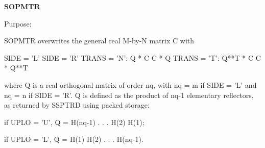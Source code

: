 {\bfseries S\+O\+P\+M\+T\+R} 

 \begin{DoxyParagraph}{Purpose\+: }
\begin{DoxyVerb} SOPMTR overwrites the general real M-by-N matrix C with

                 SIDE = 'L'     SIDE = 'R'
 TRANS = 'N':      Q * C          C * Q
 TRANS = 'T':      Q**T * C       C * Q**T

 where Q is a real orthogonal matrix of order nq, with nq = m if
 SIDE = 'L' and nq = n if SIDE = 'R'. Q is defined as the product of
 nq-1 elementary reflectors, as returned by SSPTRD using packed
 storage:

 if UPLO = 'U', Q = H(nq-1) . . . H(2) H(1);

 if UPLO = 'L', Q = H(1) H(2) . . . H(nq-1).\end{DoxyVerb}
 
\end{DoxyParagraph}

